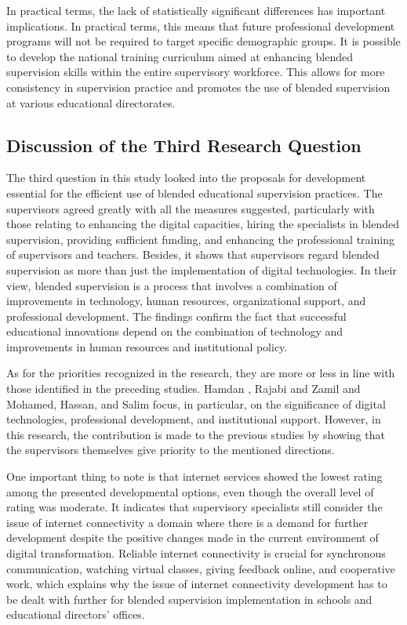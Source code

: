 \documentclass[10pt]{NSP1}
\begin{document}
\noindent In practical terms, the lack of statistically significant differences has important implications. In practical terms, this means that future professional development programs will not be required to target specific demographic groups. It is possible to develop the national training curriculum aimed at enhancing blended supervision skills within the entire supervisory workforce. This allows for more consistency in supervision practice and promotes the use of blended supervision at various educational directorates.

\subsection{Discussion of the Third Research Question}

\noindent The third question in this study looked into the proposals for development essential for the efficient use of blended educational supervision practices. The supervisors agreed greatly with all the measures suggested, particularly with those relating to enhancing the digital capacities, hiring the specialists in blended supervision, providing sufficient funding, and enhancing the professional training of supervisors and teachers. Besides, it shows that supervisors regard blended supervision as more than just the implementation of digital technologies. In their view, blended supervision is a process that involves a combination of improvements in technology, human resources, organizational support, and professional development. The findings confirm the fact that successful educational innovations depend on the combination of technology and improvements in human resources and institutional policy.

\noindent As for the priorities recognized in the research, they are more or less in line with those identified in the preceding studies. Hamdan \cite{ref21}, Rajabi and Zamil \cite{ref23} and Mohamed, Hassan, and Salim \cite{ref15} focus, in particular, on the significance of digital technologies, professional development, and institutional support. However, in this research, the contribution is made to the previous studies by showing that the supervisors themselves give priority to the mentioned directions.

\noindent One important thing to note is that internet services showed the lowest rating among the presented developmental options, even though the overall level of rating was moderate. It indicates that supervisory specialists still consider the issue of internet connectivity a domain where there is a demand for further development despite the positive changes made in the current environment of digital transformation. Reliable internet connectivity is crucial for synchronous communication, watching virtual classes, giving feedback online, and cooperative work, which explains why the issue of internet connectivity development has to be dealt with further for blended supervision implementation in schools and educational directors' offices.
\end{document}

